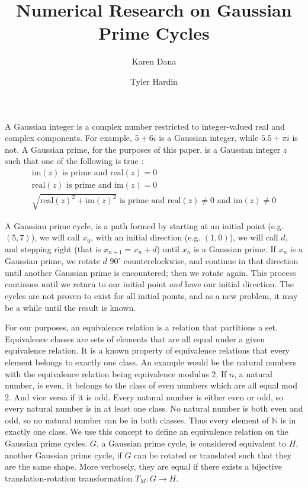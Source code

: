 \documentclass{article}
\title{Numerical Research on Gaussian Prime Cycles}
\author{Karen Dana \and Tyler Hardin}
\begin{document}
	\maketitle
	
A Gaussian integer is a complex number restricted to integer-valued real and complex components. For example, $5+6i$ is a Gaussian integer, while $5.5+\pi i$ is not. A Gaussian prime, for the purposes of this paper, is a Gaussian integer $z$ such that one of the following is true \cite{elem_num_thry}:
\begin{gather*}
  \mbox{im}(z) \mbox{ is prime and } \mbox{real}(z) = 0 \\
  \mbox{real}(z) \mbox{ is prime and } \mbox{im}(z) = 0 \\
  \sqrt{\mbox{real}(z)^2 + \mbox{im}(z)^2} \mbox{ is prime and } \mbox{real}(z) \neq 0 \mbox{ and } \mbox{im}(z) \neq 0
\end{gather*}
  
A Gaussian prime cycle, is a path formed by starting at an initial point (e.g. $(5,7)$), we will call $x_0$, with an initial direction (e.g. $(1,0)$), we will call $d$, and stepping right (that is $x_{n+1}=x_n + d$) until $x_n$ is a Gaussian prime. If $x_n$ is a Gaussian prime, we rotate $d$ $90^{\circ}$ counterclockwise, and continue in that direction until another Gaussian prime is encountered; then we rotate again. This process continues until we return to our initial point \textit{and} have our initial direction. The cycles are not proven to exist for all initial points, and as a new problem, it may be a while until the result is known. \cite{mathoverflow,wolfram}

For our purposes, an equivalence relation is a relation that partitions a set. 
Equivalence classes are sets of elements that are all equal under a given equivalence relation. It is a known property of equivalence relations that every element belongs to exactly one class.
An example would be the natural numbers with the equivalence relation being equivalence modulus 2.
If $n$, a natural number, is even, it belongs to the class of even numbers which are all equal mod 2.
And vice versa if it is odd. Every natural number is either even or odd, so every natural number is in at least one class. No natural number is both even and odd, so no natural number can be in both classes. Thus every element of $\mathbb{N}$ is in exactly one class.
We use this concept to define an equivalence relation on the Gaussian prime cycles.
$G$, a Gaussian prime cycle, is considered equivalent to $H$, another Gaussian prime cycle, if $G$ can be rotated or translated such that they are the same shape.
More verbosely, they are equal if there exists a bijective translation-rotation transformation $T_M:G \to H$.
\end{document}
